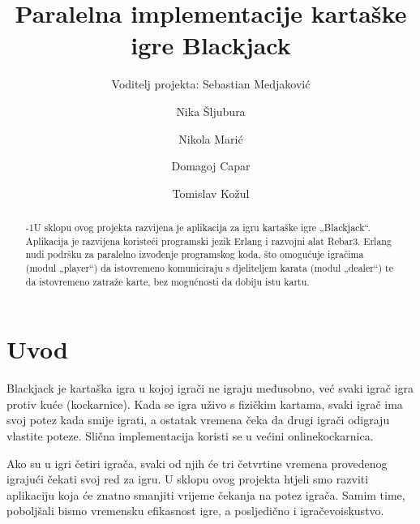 \documentclass{IEEEcsmag}
\begin{document}

\title{Paralelna implementacije kartaške igre Blackjack}

\author{Voditelj projekta: Sebastian Medjaković}

\author{Nika Šljubura}

\author{Nikola Marić}

\author{Domagoj Capar}

\author{Tomislav Kožul}


\begin{abstract}\looseness-1U sklopu ovog projekta razvijena je aplikacija za igru kartaške igre „Blackjack“. Aplikacija je razvijena koristeći programski jezik Erlang i razvojni alat Rebar3. Erlang nudi podršku za paralelno izvođenje programskog koda, što omogućuje igračima (modul „player“) da istovremeno komuniciraju s djeliteljem karata (modul „dealer“) te da istovremeno zatraže karte, bez mogućnosti da dobiju istu kartu.
\end{abstract}

\maketitle

\section{Uvod}
\vspace{5mm}
Blackjack \cite{rules} je kartaška igra u kojoj igrači ne igraju međusobno, već svaki igrač igra protiv kuće (kockarnice). Kada se igra uživo s fizičkim kartama, svaki igrač ima svoj potez kada smije igrati, a ostatak vremena čeka da drugi igrači odigraju vlastite poteze. Slična implementacija koristi se u većini online\break kockarnica.

Ako su u igri četiri igrača, svaki od njih će tri četvrtine vremena provedenog igrajući čekati svoj red za igru. U sklopu ovog projekta htjeli smo razviti aplikaciju koja će znatno smanjiti vrijeme čekanja na potez igrača. Samim time, poboljšali bismo vremensku efikasnost igre, a posljedično i igračevo\break iskustvo.
\end{document}
